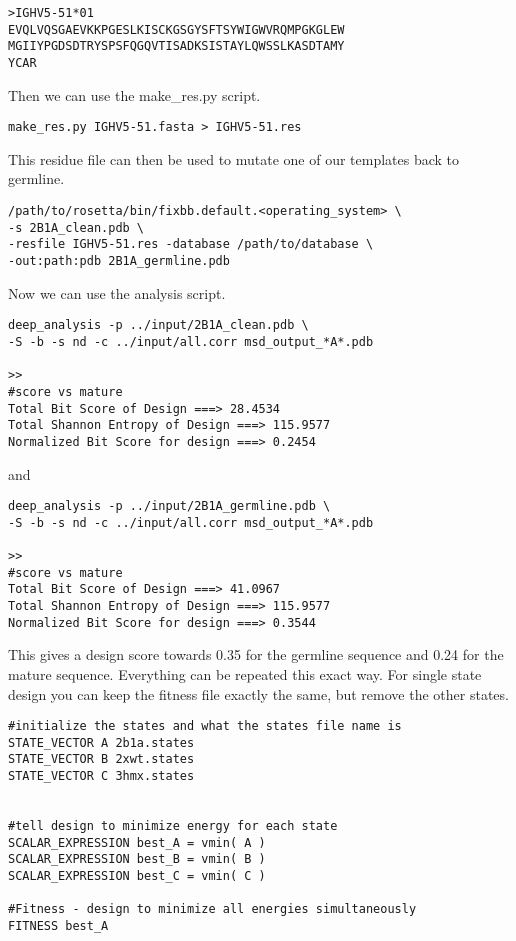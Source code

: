 \begin{verbatim}
>IGHV5-51*01
EVQLVQSGAEVKKPGESLKISCKGSGYSFTSYWIGWVRQMPGKGLEW
MGIIYPGDSDTRYSPSFQGQVTISADKSISTAYLQWSSLKASDTAMY
YCAR
\end{verbatim}

Then we can use the make\_res.py script.

\begin{lstlisting}
make_res.py IGHV5-51.fasta > IGHV5-51.res
\end{lstlisting}

This residue file can then be used to mutate one of our templates back to germline.
\begin{lstlisting}
/path/to/rosetta/bin/fixbb.default.<operating_system> \
-s 2B1A_clean.pdb \
-resfile IGHV5-51.res -database /path/to/database \
-out:path:pdb 2B1A_germline.pdb
\end{lstlisting}

Now we can use the analysis script.
\begin{lstlisting}
deep_analysis -p ../input/2B1A_clean.pdb \
-S -b -s nd -c ../input/all.corr msd_output_*A*.pdb

>>
#score vs mature
Total Bit Score of Design ===> 28.4534
Total Shannon Entropy of Design ===> 115.9577
Normalized Bit Score for design ===> 0.2454
\end{lstlisting}

and

\begin{lstlisting}
deep_analysis -p ../input/2B1A_germline.pdb \
-S -b -s nd -c ../input/all.corr msd_output_*A*.pdb

>>
#score vs mature
Total Bit Score of Design ===> 41.0967
Total Shannon Entropy of Design ===> 115.9577
Normalized Bit Score for design ===> 0.3544
\end{lstlisting}

This gives a design score towards 0.35 for the germline sequence and 0.24 for the mature sequence. Everything can be repeated this exact way. For single state design you can keep the fitness file exactly the same, but remove the other states.

\begin{lstlisting}
#initialize the states and what the states file name is
STATE_VECTOR A 2b1a.states
STATE_VECTOR B 2xwt.states
STATE_VECTOR C 3hmx.states


#tell design to minimize energy for each state
SCALAR_EXPRESSION best_A = vmin( A )
SCALAR_EXPRESSION best_B = vmin( B )
SCALAR_EXPRESSION best_C = vmin( C )

#Fitness - design to minimize all energies simultaneously
FITNESS best_A
\end{lstlisting}

